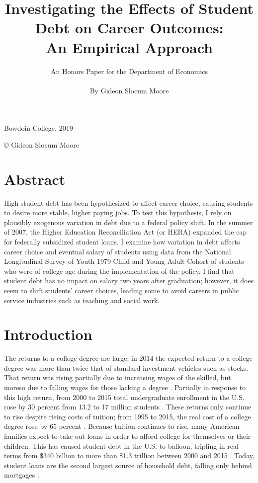 \documentclass[12pt]{article}
\title{\vfill Investigating the Effects of Student Debt on Career Outcomes:\\ An Empirical Approach \vfill}
\author{An Honors Paper for the Department of Economics \\ \\ By Gideon Slocum Moore}
\date{}
\begin{document}
	{ \maketitle}
	\thispagestyle{empty}
	\vfill
	
	

	\begin{center}
		Bowdoin College, 2019

		\copyright {} Gideon Slocum Moore
	\end{center}

	\vfill

	\pagebreak
	
	\setcounter{page}{1}
	
	\section*{Abstract}
	
	High student debt has been hypothesized to affect career choice, causing students to desire more stable, higher paying jobs. To test this hypothesis, I rely on plausibly exogenous variation in debt due to a federal policy shift. In the summer of 2007, the Higher Education Reconciliation Act (or HERA) expanded the cap for federally subsidized student loans. I examine how variation in debt affects career choice and eventual salary of students using data from the National Longitudinal Survey of Youth 1979 Child and Young Adult Cohort of students who were of college age during the implementation of the policy. I find that student debt has no impact on salary two years after graduation; however, it does seem to shift students' career choices, leading some to avoid careers in public service industries such as teaching and social work.
	
	\pagebreak
	
	\section{Introduction}
	
	The returns to a college degree are large; in 2014 the expected return to a college degree was more than twice that of standard investment vehicles such as stocks. That return was rising partially due to increasing wages of the skilled, but moreso due to falling wages for those lacking a degree \parencite{abel2014}. Partially in response to this high return, from 2000 to 2015 total undergraduate enrollment in the U.S. rose by 30 percent from 13.2 to 17 million students \parencite{mcfarland2017}. These returns only continue to rise despite rising costs of tuition; from 1995 to 2015, the real cost of a college degree rose by 65 percent \parencite{doe2016}. Because tuition continues to rise, many American families expect to take out loans in order to afford college for themselves or their children. This has caused student debt in the U.S. to balloon, tripling in real terms from \$340 billion to more than \$1.3 trillion between 2000 and 2015 \parencite{feiveson2018}. Today, student loans are the second largest source of household debt, falling only behind mortgages \parencite{dynarski2015}. 
	
\end{document}
